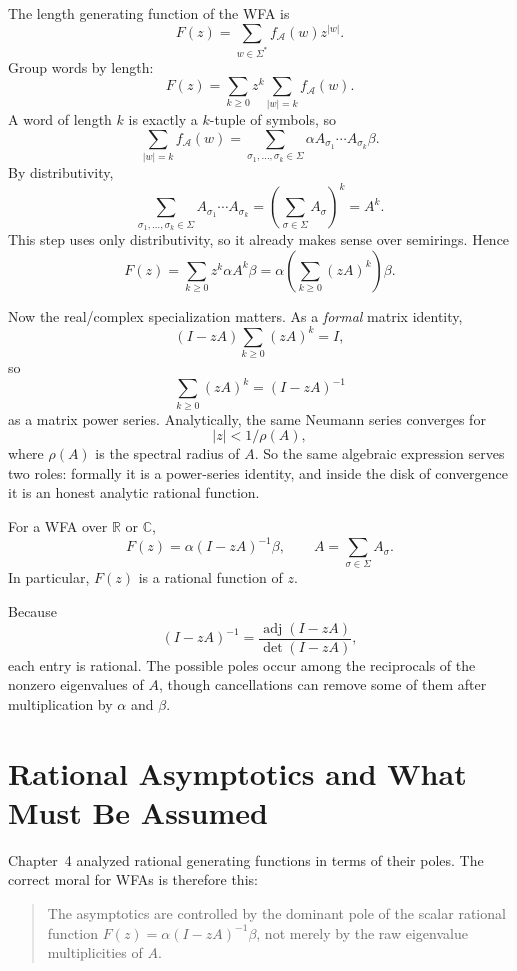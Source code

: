 The length generating function of the WFA is
\[
  F(z) = \sum_{w \in \Sigma^*} f_{\mathcal A}(w) z^{|w|}.
\]
Group words by length:
\[
  F(z) = \sum_{k \ge 0} z^k \sum_{|w|=k} f_{\mathcal A}(w).
\]
A word of length $k$ is exactly a $k$-tuple of symbols, so
\[
  \sum_{|w|=k} f_{\mathcal A}(w)
  = \sum_{\sigma_1,\dots,\sigma_k \in \Sigma} \alpha A_{\sigma_1}\cdots A_{\sigma_k}\beta.
\]
By distributivity,
\[
  \sum_{\sigma_1,\dots,\sigma_k \in \Sigma} A_{\sigma_1}\cdots A_{\sigma_k}
  = \left(\sum_{\sigma \in \Sigma} A_\sigma\right)^k
  = A^k.
\]
This step uses only distributivity, so it already makes sense over semirings. Hence
\[
  F(z) = \sum_{k \ge 0} z^k \alpha A^k \beta = \alpha \left(\sum_{k \ge 0} (zA)^k\right) \beta.
\]

Now the real/complex specialization matters. As a \emph{formal} matrix identity,
\[
  (I-zA)\sum_{k \ge 0} (zA)^k = I,
\]
so
\[
  \sum_{k \ge 0} (zA)^k = (I-zA)^{-1}
\]
as a matrix power series. Analytically, the same Neumann series converges for
\[
  |z| < 1/\rho(A),
\]
where $\rho(A)$ is the spectral radius of $A$.
So the same algebraic expression serves two roles: formally it is a power-series identity, and inside the disk of convergence it is an honest analytic rational function.

\begin{theorem}
\label{thm:wfa-rational}
For a WFA over $\mathbb{R}$ or $\mathbb{C}$,
\[
  F(z) = \alpha (I-zA)^{-1} \beta,
  \qquad
  A = \sum_{\sigma \in \Sigma} A_\sigma.
\]
In particular, $F(z)$ is a rational function of $z$.
\end{theorem}

Because
\[
  (I-zA)^{-1} = \frac{\operatorname{adj}(I-zA)}{\det(I-zA)},
\]
each entry is rational. The possible poles occur among the reciprocals of the nonzero eigenvalues of $A$, though cancellations can remove some of them after multiplication by $\alpha$ and $\beta$.

\section{Rational Asymptotics and What Must Be Assumed}

Chapter~4 analyzed rational generating functions in terms of their poles. The correct moral for WFAs is therefore this:

\begin{quote}
The asymptotics are controlled by the dominant pole of the scalar rational function $F(z)=\alpha(I-zA)^{-1}\beta$, not merely by the raw eigenvalue multiplicities of $A$.
\end{quote}

